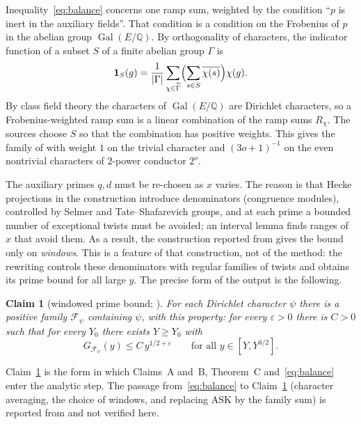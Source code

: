 \documentclass[11pt]{amsart}
\newtheorem{claim}[theorem]{Claim}
\theoremstyle{definition}
\theoremstyle{remark}
\DeclareMathOperator{\Gal}{Gal}
\newcommand{\Q}{\mathbb{Q}}
\newcommand{\ASK}{\mathrm{ASK}}
\begin{document}
Inequality~\eqref{eq:balance} concerns one ramp sum, weighted by the condition ``$p$ is inert in the auxiliary fields''. That condition is a condition on the Frobenius of $p$ in the abelian group $\Gal(E/\Q)$. By orthogonality of characters, the indicator function of a subset $S$ of a finite abelian group $\Gamma$ is
\[
\mathbf 1_S(g)=\frac1{|\Gamma|}\sum_{\chi\in\widehat\Gamma}\Bigl(\sum_{s\in S}\overline{\chi(s)}\Bigr)\chi(g).
\]
By class field theory the characters of $\Gal(E/\Q)$ are Dirichlet characters, so a Frobenius-weighted ramp sum is a linear combination of the ramp sums $R_\chi$. The sources choose $S$ so that the combination has positive weights. This gives the family of \cite{golf} with weight $1$ on the trivial character and $(3o+1)^{-1}$ on the even nontrivial characters of $2$-power conductor $2^{o}$.

The auxiliary primes $q,d$ must be re-chosen as $x$ varies. The reason is that Hecke projections in the construction introduce denominators (congruence modules), controlled by Selmer and Tate--Shafarevich groups, and at each prime a bounded number of exceptional twists must be avoided; an interval lemma finds ranges of $x$ that avoid them. As a result, the construction reported from \cite{golf} gives the bound only on \emph{windows}. This is a feature of that construction, not of the method: the rewriting \cite{grhlean} controls these denominators with regular families of twists and obtains its prime bound for all large $y$. The precise form of the output is the following.

\begin{claim}[windowed prime bound; {\cite{Alpoge,golf}}]\label{claim:window}
For each Dirichlet character $\psi$ there is a positive family $\mathcal F_\psi$ containing $\psi$, with this property: for every $\varepsilon>0$ there is $C>0$ such that for every $Y_0$ there exists $Y\ge Y_0$ with
\[
G_{\mathcal F_\psi}(y)\le C\,y^{1/2+\varepsilon}\qquad\text{for all }y\in[Y,Y^{3/2}].
\]
\end{claim}

Claim~\ref{claim:window} is the form in which Claims~A and~B, Theorem~C and~\eqref{eq:balance} enter the analytic step. The passage from~\eqref{eq:balance} to Claim~\ref{claim:window} (character averaging, the choice of windows, and replacing $\ASK$ by the family sum) is reported from \cite{golf} and not verified here.
\end{document}
